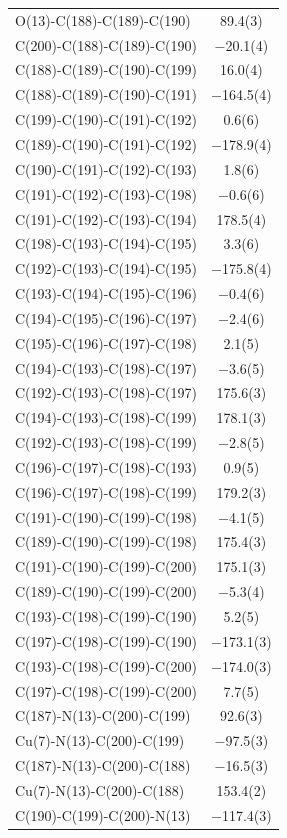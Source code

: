 \begin{center}
{\begin{supertabular}{p{1.8in}c}
O(13)-C(188)-C(189)-C(190)&89.4(3)\\
C(200)-C(188)-C(189)-C(190)&$-$20.1(4)\\
C(188)-C(189)-C(190)-C(199)&16.0(4)\\
C(188)-C(189)-C(190)-C(191)&$-$164.5(4)\\
C(199)-C(190)-C(191)-C(192)&0.6(6)\\
C(189)-C(190)-C(191)-C(192)&$-$178.9(4)\\
C(190)-C(191)-C(192)-C(193)&1.8(6)\\
C(191)-C(192)-C(193)-C(198)&$-$0.6(6)\\
C(191)-C(192)-C(193)-C(194)&178.5(4)\\
C(198)-C(193)-C(194)-C(195)&3.3(6)\\
C(192)-C(193)-C(194)-C(195)&$-$175.8(4)\\
C(193)-C(194)-C(195)-C(196)&$-$0.4(6)\\
C(194)-C(195)-C(196)-C(197)&$-$2.4(6)\\
C(195)-C(196)-C(197)-C(198)&2.1(5)\\
C(194)-C(193)-C(198)-C(197)&$-$3.6(5)\\
C(192)-C(193)-C(198)-C(197)&175.6(3)\\
C(194)-C(193)-C(198)-C(199)&178.1(3)\\
C(192)-C(193)-C(198)-C(199)&$-$2.8(5)\\
C(196)-C(197)-C(198)-C(193)&0.9(5)\\
C(196)-C(197)-C(198)-C(199)&179.2(3)\\
C(191)-C(190)-C(199)-C(198)&$-$4.1(5)\\
C(189)-C(190)-C(199)-C(198)&175.4(3)\\
C(191)-C(190)-C(199)-C(200)&175.1(3)\\
C(189)-C(190)-C(199)-C(200)&$-$5.3(4)\\
C(193)-C(198)-C(199)-C(190)&5.2(5)\\
C(197)-C(198)-C(199)-C(190)&$-$173.1(3)\\
C(193)-C(198)-C(199)-C(200)&$-$174.0(3)\\
C(197)-C(198)-C(199)-C(200)&7.7(5)\\
C(187)-N(13)-C(200)-C(199)&92.6(3)\\
Cu(7)-N(13)-C(200)-C(199)&$-$97.5(3)\\
C(187)-N(13)-C(200)-C(188)&$-$16.5(3)\\
Cu(7)-N(13)-C(200)-C(188)&153.4(2)\\
C(190)-C(199)-C(200)-N(13)&$-$117.4(3)\\

\end{supertabular}}
\end{center}
